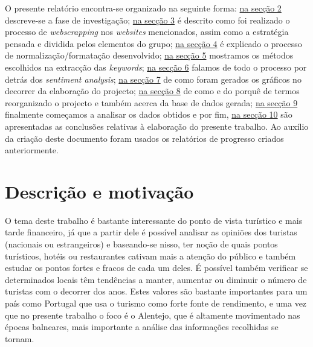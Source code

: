 O presente relatório encontra-se organizado na seguinte forma: \hyperref[cap2]{na secção 2} descreve-se a fase de investigação; \hyperref[cap3]{na secção 3} é descrito como foi realizado o processo de \textit{webscrapping} nos \textit{websites} mencionados, assim como a estratégia pensada e dividida pelos elementos do grupo; \hyperref[cap4]{na secção 4} é explicado o processo de normalização/formatação desenvolvido; \hyperref[cap5]{na secção 5} mostramos os métodos escolhidos na extracção das \textit{keywords}; \hyperref[cap6]{na secção 6} falamos de todo o processo por detrás dos \textit{sentiment analysis}; \hyperref[cap7]{na secção 7} de como foram gerados os gráficos no decorrer da elaboração do projecto; \hyperref[cap8]{na secção 8} de como e do porquê de termos reorganizado o projecto e também acerca da base de dados gerada; \hyperref[cap9]{na secção 9} finalmente começamos a analisar os dados obtidos e por fim, \hyperref[cap10]{na secção 10} são apresentadas as conclusões relativas à elaboração do presente trabalho. Ao auxílio da criação deste documento foram usados os relatórios de progresso criados anteriormente.

\section{Descrição e motivação}
O tema deste trabalho é bastante interessante do ponto de vista turístico e mais tarde financeiro, já que a partir dele é possível analisar as opiniões dos turistas (nacionais ou estrangeiros) e baseando-se nisso, ter noção de quais pontos turísticos, hotéis ou restaurantes cativam mais a atenção do público e também estudar os pontos fortes e fracos de cada um deles. É possível também verificar se determinados locais têm tendências a manter, aumentar ou diminuir o número de turistas com o decorrer dos anos. Estes valores são bastante importantes para um país como Portugal que usa o turismo como forte fonte de rendimento, e uma vez que no presente trabalho o foco é o Alentejo, que é altamente movimentado nas épocas balneares, mais importante a análise das informações recolhidas se tornam. 

